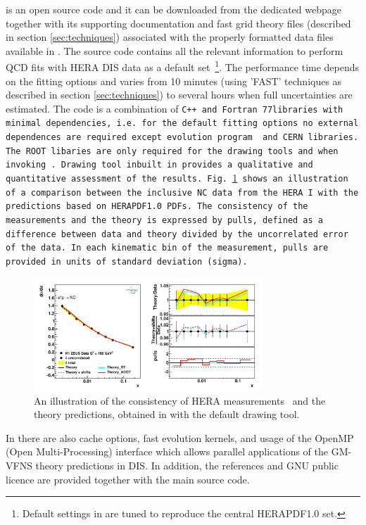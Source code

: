 
\fitter is an open source code and it can be downloaded from the dedicated webpage \cite{herafitter:page}
together with its supporting documentation and 
fast grid theory files (described in section \ref{sec:techniques}) associated with the properly formatted data files available in \fitter.
The source code contains all the relevant information to perform QCD fits with HERA DIS data as a default 
set~\footnote{Default settings in \fitter are tuned to reproduce the central HERAPDF1.0 set.}. 
The performance time depends on the fitting options and varies from 10 minutes 
(using 'FAST' techniques as described in section \ref{sec:techniques}) to several hours when full uncertainties are estimated. The \fitter code is a combination of \tt C++ \rm and \tt Fortran 77\rm libraries with minimal 
dependencies, i.e. for the default fitting options no external dependences are required except \qcdnum evolution program \cite{qcdnum} and CERN libraries. 
The \tt ROOT \rm  libaries are only required for the drawing tools and when invoking \applgrid.  
Drawing tool inbuilt in \fitter provides a qualitative and quantitative assessment of the results.
Fig.~\ref{fig:data} shows an illustration of a comparison between the inclusive NC data from the HERA I
with the predictions based on 
HERAPDF1.0 PDFs.
The consistency of the measurements and the theory is expressed by pulls, defined as a difference between data and theory divided by the uncorrelated error of the data. 
In each kinematic bin of the measurement, pulls are provided in units of standard deviation (sigma).  
\begin{figure}[!ht]
   \centering
   \includegraphics[width=8.6cm]{datatheory.pdf}
   \caption{An illustration of the consistency of HERA measurements~\cite{h1zeus:2009wt} and the theory predictions, 
       obtained in \fitter with the default drawing tool.} 
 \label{fig:data}
\end{figure}

%
In \fitter there are also cache options, fast evolution kernels, and usage of the OpenMP (Open Multi-Processing) 
interface which allows parallel applications of the GM-VFNS theory predictions in DIS. 
In addition, the \fitter references and GNU public licence are provided 
together with the main source code. 


